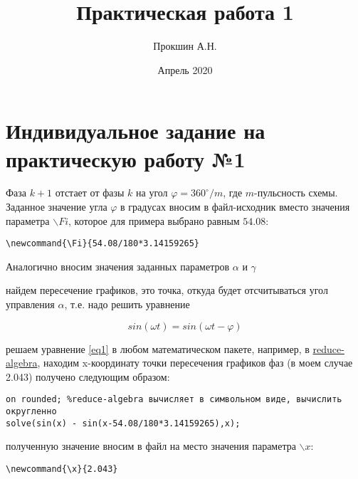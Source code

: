 \documentclass{article}
\title{Практическая работа 1}
\author{Прокшин А.Н.}
\date{Апрель 2020}
\begin{document}
\maketitle

\section{Индивидуальное задание на практическую работу №1}

\newcommand{\PI}{3.14159265}
\newcommand{\Fi}{54.08/180*3.14159265} %

Фаза $k+1$ отстает от фазы $k$ на угол $\varphi=360^\circ/m$, где $m$-пульсность схемы. Заданное значение угла $\varphi$ в градусах вносим в файл-исходник 
вместо значения параметра $\backslash Fi$, которое для примера выбрано равным $54.08$:

\begin{verbatim}
\newcommand{\Fi}{54.08/180*3.14159265}
\end{verbatim}

Аналогично вносим значения заданных параметров $\alpha$ и $\gamma$ 
\newcommand{\alfa}{0.524}  %
\newcommand{\gammaa}{0.698} %


найдем пересечение графиков, это точка, откуда будет отсчитываться угол управления $\alpha$, т.е. надо решить уравнение

\begin{equation} %
sin(\omega t) = sin(\omega t - \varphi)
	\label{eq1}
\end{equation}   %



решаем уравнение \ref{eq1} в любом математическом пакете, например, в \href{http://www.reduce-algebra.com/obtaining.php}{reduce-algebra}, 
находим  x-координату точки пересечения графиков фаз (в моем случае 2.043) получено следующим образом:
\begin{verbatim}
on rounded; %reduce-algebra вычисляет в символьном виде, вычислить округленно
solve(sin(x) - sin(x-54.08/180*3.14159265),x);
\end{verbatim}

полученную значение вносим в файл на место значения параметра $\backslash x$:
\newcommand{\x}{2.043}

\begin{verbatim}
\newcommand{\x}{2.043}
\end{verbatim}
\end{document}
